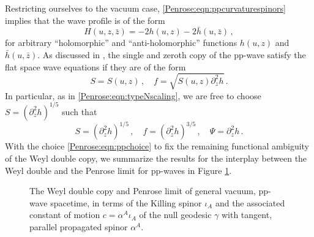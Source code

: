 Restricting ourselves to the vacuum case, \eqref{Penrose:eqn:ppcurvaturespinors} implies that the wave profile is of the form
\begin{equation}
H(u,z,\bar{z}) = -2h(u,z)-2\bar{h}(u,\bar{z})\, ,
\end{equation}
for arbitrary ``holomorphic'' and ``anti-holomorphic'' functions $h(u,z)$ and $\bar{h}(u,\bar{z})$. As discussed in \cite{Godazgar:2020zbv}, the single and zeroth copy of the pp-wave satisfy the flat space wave equations if they are of the form
\begin{equation}
S = S(u,z)  \, , \quad f = \sqrt{S(u,z)\partial_z^2 h} \, .
\end{equation}
In particular, as in \eqref{Penrose:eqn:typeNscaling}, we are free to choose  $S = \left(\partial_z^2 h\right)^{1/5}$ such that 
\begin{equation}\label{Penrose:eqn:ppchoice}
S = \left(\partial_z^2 h\right)^{1/5}  \, , \quad f =  \left(\partial_z^2 h\right)^{3/5} \, , \quad \Psi =  \partial_z^2 h \, .
\end{equation}
With the choice \eqref{Penrose:eqn:ppchoice} to fix the remaining functional ambiguity of the Weyl double copy, we summarize the results for the interplay between the Weyl double and the Penrose limit for pp-waves in Figure \ref{Penrose:fig:schematicpp}. 

\begin{figure}[t!]
	\caption{The Weyl double copy and Penrose limit of general vacuum, \relax pp-wave spacetime, in  terms of the Killing spinor $\iota_{A}$ and the associated constant of motion $c = \alpha^A \iota_A$ of the null geodesic $\gamma$ with tangent, parallel propagated spinor $\alpha^A$.} \label{Penrose:fig:schematicpp} 
\end{figure}

